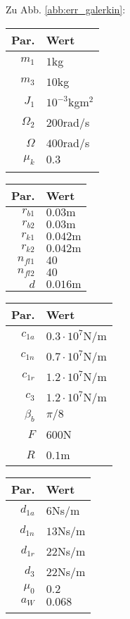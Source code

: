Zu Abb. \ref{abb:err_galerkin}:
\begin{center}
\begin{tabular}{r|l}
Par.&Wert\\\hline
$m_1$&$1$kg\\
$m_3$&$10$kg\\
$J_1$&$10^{-3}$kgm$^2$\\
$\Omega_2$&$200$rad/s\\
$\Omega$&$400$rad/s\\
$\mu_k$& $0.3$\\
&
\end{tabular}\hfill
\begin{tabular}{r|l}
Par.&Wert\\\hline
$r_{b1}$&$0.03\textrm{m}$\\
$r_{b2}$&$0.03\textrm{m}$\\
$r_{k1}$&$0.042\textrm{m}$\\
$r_{k2}$&$0.042\textrm{m}$\\
$n_{fl1}$&$40$\\
$n_{fl2}$&$40$\\
$d $&$ 0.016\textrm{m}$ \\
\end{tabular}\hfill
\begin{tabular}{r|l}
Par.&Wert\\\hline
$c_{1a}$&$0.3\cdot10^{7}$N/m\\
$c_{1n}$&$0.7\cdot10^{7}$N/m\\
$c_{1r}$&$1.2\cdot10^{7}$N/m\\
$c_{3}$&$1.2\cdot10^{7}$N/m\\
$\beta_b $&$ \pi/8$\\
$F$&$600$N\\
$R$&$0.1$m\\
\end{tabular}\hfill
\begin{tabular}{r|l}
Par.&Wert\\\hline
$d_{1a}$&$6$Ns/m\\
$d_{1n}$&$13$Ns/m\\
$d_{1r}$&$22$Ns/m\\
$d_{3}$&$22$Ns/m\\
$\mu_0$&$0.2$\\
$a_W $&$ 0.068$\\
&
\end{tabular}
\end{center}
\newpage

